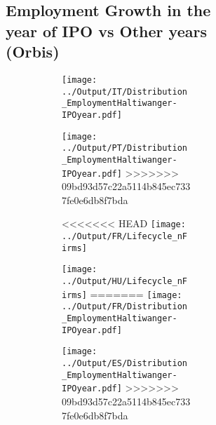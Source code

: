 \documentclass[12pt,notitlepage]{article}
\begin{document}
\begin{figure}[!htpb]
\begin{subfigure}{.49\textwidth}
\subsection{Employment Growth in the year of IPO vs Other years (Orbis)}
\begin{figure}[!htpb]
\centering
\begin{subfigure}{.49\textwidth}
    \centering
 \texttt{[image: ../Output/IT/Distribution\_EmploymentHaltiwanger-IPOyear.pdf]}
\end{subfigure}%
\begin{subfigure}{.49\textwidth}
    \centering
 \texttt{[image: ../Output/PT/Distribution\_EmploymentHaltiwanger-IPOyear.pdf]}
>>>>>>> 09bd93d57c22a5114b845ec7337fe0e6db8f7bda
\end{subfigure}
\begin{subfigure}{.49\textwidth}
    \centering
<<<<<<< HEAD
 \texttt{[image: ../Output/FR/Lifecycle\_nFirms]}
\end{subfigure}%
\begin{subfigure}{.49\textwidth}
    \centering
 \texttt{[image: ../Output/HU/Lifecycle\_nFirms]}
=======
 \texttt{[image: ../Output/FR/Distribution\_EmploymentHaltiwanger-IPOyear.pdf]}
\end{subfigure}%
\begin{subfigure}{.49\textwidth}
    \centering
 \texttt{[image: ../Output/ES/Distribution\_EmploymentHaltiwanger-IPOyear.pdf]}
>>>>>>> 09bd93d57c22a5114b845ec7337fe0e6db8f7bda
\end{subfigure}
\end{figure}
\pagebreak


\end{subfigure}
\end{figure}
\end{document}
